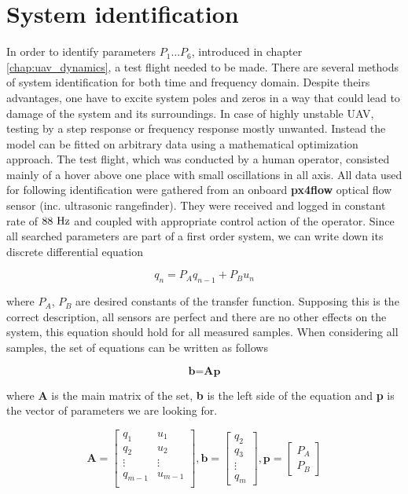 \section{System identification}
\label{cap:system_identification}

In order to identify parameters $P_1 \hdots P_6$, introduced in chapter \ref{chap:uav_dynamics}, a test flight needed to be made. There are several methods of system identification for both time and frequency domain. Despite theirs advantages, one have to excite system poles and zeros in a way that could lead to damage of the system and its surroundings. In case of highly unstable UAV, testing by a step response or frequency response mostly unwanted. Instead the model can be fitted on arbitrary data using a mathematical optimization approach. The test flight, which was conducted by a human operator, consisted mainly of a hover above one place with small oscillations in all axis. All data used for following identification were gathered from an onboard \textbf{px4flow} optical flow sensor (inc. ultrasonic rangefinder). They were received and logged in constant rate of $88~\mathrm{Hz}$ and coupled with appropriate control action of the operator. Since all searched parameters are part of a first order system, we can write down its discrete differential equation

\begin{equation}
q_n = P_Aq_{n-1} + P_Bu_n
\end{equation}

where $P_A$, $P_B$ are desired constants of the transfer function. Supposing this is the correct description, all sensors are perfect and there are no other effects on the system, this equation should hold for all measured samples. When considering all samples, the set of equations can be written as follows

\begin{equation}
\textbf{b} = \textbf{A}\textbf{p}
\label{eq:bap}
\end{equation}

where \textbf{A} is the main matrix of the set, \textbf{b} is the left side of the equation and \textbf{p} is the vector of parameters we are looking for.

\begin{equation}
\textbf{A} = \begin{bmatrix}
q_1 & u_1 \\
q_2 & u_2 \\
\vdots & \vdots \\
q_{m-1} & u_{m-1} \\
\end{bmatrix},
\textbf{b} = \begin{bmatrix}
q_2 \\
q_3 \\
\vdots\\
q_m
\end{bmatrix},
\textbf{p} = \begin{bmatrix}
P_A \\
P_B
\end{bmatrix}
\end{equation}

